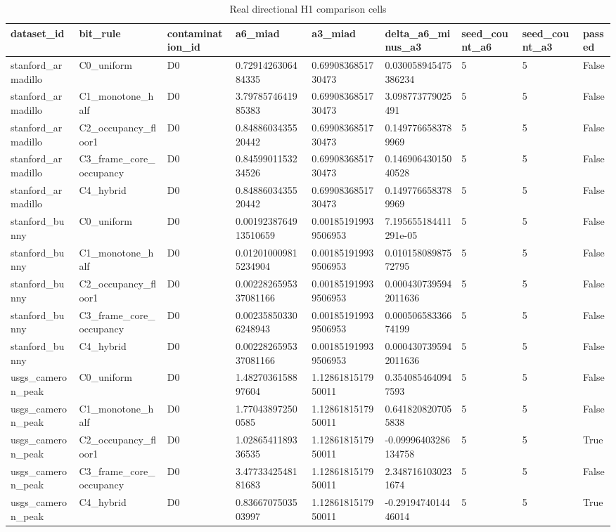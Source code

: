 \begin{table}
\caption{Real directional H1 comparison cells}
\label{tab:real\_directional\_h1}
\begin{tabular}{lllllllll}
\toprule
dataset\_id & bit\_rule & contamination\_id & a6\_miad & a3\_miad & delta\_a6\_minus\_a3 & seed\_count\_a6 & seed\_count\_a3 & passed \\
\midrule
stanford\_armadillo & C0\_uniform & D0 & 0.7291426306484335 & 0.6990836851730473 & 0.030058945475386234 & 5 & 5 & False \\
stanford\_armadillo & C1\_monotone\_half & D0 & 3.7978574641985383 & 0.6990836851730473 & 3.098773779025491 & 5 & 5 & False \\
stanford\_armadillo & C2\_occupancy\_floor1 & D0 & 0.8488603435520442 & 0.6990836851730473 & 0.1497766583789969 & 5 & 5 & False \\
stanford\_armadillo & C3\_frame\_core\_occupancy & D0 & 0.8459901153234526 & 0.6990836851730473 & 0.14690643015040528 & 5 & 5 & False \\
stanford\_armadillo & C4\_hybrid & D0 & 0.8488603435520442 & 0.6990836851730473 & 0.1497766583789969 & 5 & 5 & False \\
stanford\_bunny & C0\_uniform & D0 & 0.0019238764913510659 & 0.001851919939506953 & 7.195655184411291e-05 & 5 & 5 & False \\
stanford\_bunny & C1\_monotone\_half & D0 & 0.012010009815234904 & 0.001851919939506953 & 0.01015808987572795 & 5 & 5 & False \\
stanford\_bunny & C2\_occupancy\_floor1 & D0 & 0.0022826595337081166 & 0.001851919939506953 & 0.0004307395942011636 & 5 & 5 & False \\
stanford\_bunny & C3\_frame\_core\_occupancy & D0 & 0.002358503306248943 & 0.001851919939506953 & 0.00050658336674199 & 5 & 5 & False \\
stanford\_bunny & C4\_hybrid & D0 & 0.0022826595337081166 & 0.001851919939506953 & 0.0004307395942011636 & 5 & 5 & False \\
usgs\_cameron\_peak & C0\_uniform & D0 & 1.4827036158897604 & 1.1286181517950011 & 0.3540854640947593 & 5 & 5 & False \\
usgs\_cameron\_peak & C1\_monotone\_half & D0 & 1.770438972500585 & 1.1286181517950011 & 0.6418208207055838 & 5 & 5 & False \\
usgs\_cameron\_peak & C2\_occupancy\_floor1 & D0 & 1.0286541189336535 & 1.1286181517950011 & -0.09996403286134758 & 5 & 5 & True \\
usgs\_cameron\_peak & C3\_frame\_core\_occupancy & D0 & 3.4773342548181683 & 1.1286181517950011 & 2.3487161030231674 & 5 & 5 & False \\
usgs\_cameron\_peak & C4\_hybrid & D0 & 0.8366707503503997 & 1.1286181517950011 & -0.2919474014446014 & 5 & 5 & True \\
\bottomrule
\end{tabular}
\end{table}
